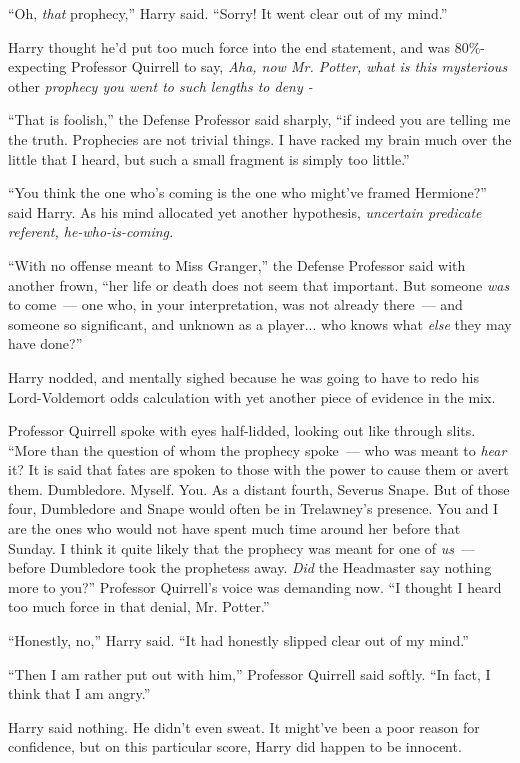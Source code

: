 ``Oh, \emph{that} prophecy,'' Harry said. ``Sorry! It went clear out of my mind.''

Harry thought he'd put too much force into the end statement, and was 80\%-expecting Professor Quirrell to say, \emph{Aha, now Mr. Potter, what is this mysterious} other \emph{prophecy you went to such lengths to deny -}

``That is foolish,'' the Defense Professor said sharply, ``if indeed you are telling me the truth. Prophecies are not trivial things. I have racked my brain much over the little that I heard, but such a small fragment is simply too little.''

``You think the one who's coming is the one who might've framed Hermione?'' said Harry. As his mind allocated yet another hypothesis, \emph{uncertain predicate referent, he-who-is-coming.}

``With no offense meant to Miss Granger,'' the Defense Professor said with another frown, ``her life or death does not seem that important. But someone \emph{was} to come~--- one who, in your interpretation, was not already there~--- and someone so significant, and unknown as a player... who knows what \emph{else} they may have done?''

Harry nodded, and mentally sighed because he was going to have to redo his Lord-Voldemort odds calculation with yet another piece of evidence in the mix.

Professor Quirrell spoke with eyes half-lidded, looking out like through slits. ``More than the question of whom the prophecy spoke~--- who was meant to \emph{hear} it? It is said that fates are spoken to those with the power to cause them or avert them. Dumbledore. Myself. You. As a distant fourth, Severus Snape. But of those four, Dumbledore and Snape would often be in Trelawney's presence. You and I are the ones who would not have spent much time around her before that Sunday. I think it quite likely that the prophecy was meant for one of \emph{us}~--- before Dumbledore took the prophetess away. \emph{Did} the Headmaster say nothing more to you?'' Professor Quirrell's voice was demanding now. ``I thought I heard too much force in that denial, Mr. Potter.''

``Honestly, no,'' Harry said. ``It had honestly slipped clear out of my mind.''

``Then I am rather put out with him,'' Professor Quirrell said softly. ``In fact, I think that I am angry.''

Harry said nothing. He didn't even sweat. It might've been a poor reason for confidence, but on this particular score, Harry did happen to be innocent.

